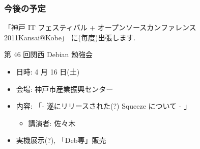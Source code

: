 \documentclass[cjk,dvipdfmx,12pt,%
hyperref={bookmarks=true,bookmarksnumbered=true,bookmarksopen=false,%
colorlinks=false,%
pdftitle={第 45 回 関西 Debian 勉強会},%
pdfauthor={倉敷・のがた・佐々木},%
pdfsubject={資料},%
}]{beamer}
\begin{document}
\begin{frame}[fragile]
\frametitle{今後の予定}

「神戸 IT フェスティバル + オープンソースカンファレンス 2011Kansai@Kobe」
に(毎度)出張します.

\begin{block}{第 46 回関西 Debian 勉強会}
  \begin{itemize}
  \item 日時: 4 月 16 日(土)
  \item 会場: 神戸市産業振興センター
  \item 内容: 「- 遂にリリースされた(?) Squeeze について - 」
    \begin{itemize}
    \item 講演者: 佐々木
    \end{itemize}
  \item 実機展示(?), 「Deb専」販売
  \end{itemize}
\end{block}

\end{frame}

\takahashi[50]{  }
\end{document}
